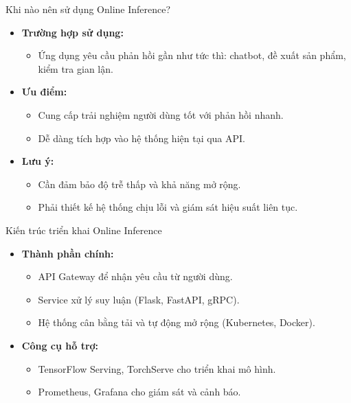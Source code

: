 \documentclass{beamer}
\begin{document}
\begin{frame}{Khi nào nên sử dụng Online Inference?}
    \begin{itemize}
        \item \textbf{Trường hợp sử dụng:}
        \begin{itemize}
            \item Ứng dụng yêu cầu phản hồi gần như tức thì: chatbot, đề xuất sản phẩm, kiểm tra gian lận.
        \end{itemize}
        \item \textbf{Ưu điểm:}
        \begin{itemize}
            \item Cung cấp trải nghiệm người dùng tốt với phản hồi nhanh.
            \item Dễ dàng tích hợp vào hệ thống hiện tại qua API.
        \end{itemize}
        \item \textbf{Lưu ý:}
        \begin{itemize}
            \item Cần đảm bảo độ trễ thấp và khả năng mở rộng.
            \item Phải thiết kế hệ thống chịu lỗi và giám sát hiệu suất liên tục.
        \end{itemize}
    \end{itemize}
\end{frame}
    
\begin{frame}{Kiến trúc triển khai Online Inference}
    \begin{itemize}
        \item \textbf{Thành phần chính:}
        \begin{itemize}
            \item API Gateway để nhận yêu cầu từ người dùng.
            \item Service xử lý suy luận (Flask, FastAPI, gRPC).
            \item Hệ thống cân bằng tải và tự động mở rộng (Kubernetes, Docker).
        \end{itemize}
        \item \textbf{Công cụ hỗ trợ:}
        \begin{itemize}
            \item TensorFlow Serving, TorchServe cho triển khai mô hình.
            \item Prometheus, Grafana cho giám sát và cảnh báo.
        \end{itemize}
    \end{itemize}
\end{frame}
\end{document}

